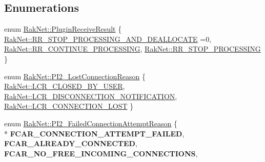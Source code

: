 \subsection*{Enumerations}
\begin{DoxyCompactItemize}
\item 
enum \hyperlink{group___p_l_u_g_i_n___i_n_t_e_r_f_a_c_e___g_r_o_u_p_ga89998adaafb29e5d879113b992161085}{Rak\-Net\-::\-Plugin\-Receive\-Result} \{ \hyperlink{group___p_l_u_g_i_n___i_n_t_e_r_f_a_c_e___g_r_o_u_p_gga89998adaafb29e5d879113b992161085afcd33db33aa6fdf749686a30ab2bddec}{Rak\-Net\-::\-R\-R\-\_\-\-S\-T\-O\-P\-\_\-\-P\-R\-O\-C\-E\-S\-S\-I\-N\-G\-\_\-\-A\-N\-D\-\_\-\-D\-E\-A\-L\-L\-O\-C\-A\-T\-E} =0, 
\hyperlink{group___p_l_u_g_i_n___i_n_t_e_r_f_a_c_e___g_r_o_u_p_gga89998adaafb29e5d879113b992161085a10d49b25874f0d9f5c420e3bf2e6c9d9}{Rak\-Net\-::\-R\-R\-\_\-\-C\-O\-N\-T\-I\-N\-U\-E\-\_\-\-P\-R\-O\-C\-E\-S\-S\-I\-N\-G}, 
\hyperlink{group___p_l_u_g_i_n___i_n_t_e_r_f_a_c_e___g_r_o_u_p_gga89998adaafb29e5d879113b992161085a9e014324e71812eabb1271984a12e238}{Rak\-Net\-::\-R\-R\-\_\-\-S\-T\-O\-P\-\_\-\-P\-R\-O\-C\-E\-S\-S\-I\-N\-G}
 \}
\item 
enum \hyperlink{group___p_l_u_g_i_n___i_n_t_e_r_f_a_c_e___g_r_o_u_p_ga376cc546fd6892c2ead48cd51796c8b8}{Rak\-Net\-::\-P\-I2\-\_\-\-Lost\-Connection\-Reason} \{ \hyperlink{group___p_l_u_g_i_n___i_n_t_e_r_f_a_c_e___g_r_o_u_p_gga376cc546fd6892c2ead48cd51796c8b8a6e61c0d570e2be4ee58ce7a58d782879}{Rak\-Net\-::\-L\-C\-R\-\_\-\-C\-L\-O\-S\-E\-D\-\_\-\-B\-Y\-\_\-\-U\-S\-E\-R}, 
\hyperlink{group___p_l_u_g_i_n___i_n_t_e_r_f_a_c_e___g_r_o_u_p_gga376cc546fd6892c2ead48cd51796c8b8a80ff559ada3a0030585a2afa8bdf46a7}{Rak\-Net\-::\-L\-C\-R\-\_\-\-D\-I\-S\-C\-O\-N\-N\-E\-C\-T\-I\-O\-N\-\_\-\-N\-O\-T\-I\-F\-I\-C\-A\-T\-I\-O\-N}, 
\hyperlink{group___p_l_u_g_i_n___i_n_t_e_r_f_a_c_e___g_r_o_u_p_gga376cc546fd6892c2ead48cd51796c8b8aff6f926616ed81a798b92aa6ee7f6b71}{Rak\-Net\-::\-L\-C\-R\-\_\-\-C\-O\-N\-N\-E\-C\-T\-I\-O\-N\-\_\-\-L\-O\-S\-T}
 \}
\item 
enum \hyperlink{group___p_l_u_g_i_n___i_n_t_e_r_f_a_c_e___g_r_o_u_p_ga3e92f686bace869b78c10508c58e0825}{Rak\-Net\-::\-P\-I2\-\_\-\-Failed\-Connection\-Attempt\-Reason} \{ \\*
{\bfseries F\-C\-A\-R\-\_\-\-C\-O\-N\-N\-E\-C\-T\-I\-O\-N\-\_\-\-A\-T\-T\-E\-M\-P\-T\-\_\-\-F\-A\-I\-L\-E\-D}, 
{\bfseries F\-C\-A\-R\-\_\-\-A\-L\-R\-E\-A\-D\-Y\-\_\-\-C\-O\-N\-N\-E\-C\-T\-E\-D}, 
{\bfseries F\-C\-A\-R\-\_\-\-N\-O\-\_\-\-F\-R\-E\-E\-\_\-\-I\-N\-C\-O\-M\-I\-N\-G\-\_\-\-C\-O\-N\-N\-E\-C\-T\-I\-O\-N\-S}, 

\end{DoxyCompactItemize}
